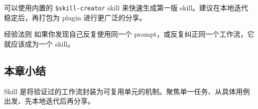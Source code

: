 可以使用内置的 \texttt{\$skill-creator} skill 来快速生成第一版 skill。建议在本地迭代稳定后，再打包为 plugin 进行更广泛的分享。

\begin{knowledgebox}{经验法则}
如果你发现自己反复使用同一个 prompt，或反复纠正同一个工作流，它就应该成为一个 skill。
\end{knowledgebox}

\subsection{本章小结}

Skill 是将验证过的工作流封装为可复用单元的机制。聚焦单一任务、从具体用例出发、先本地迭代后再分享。

